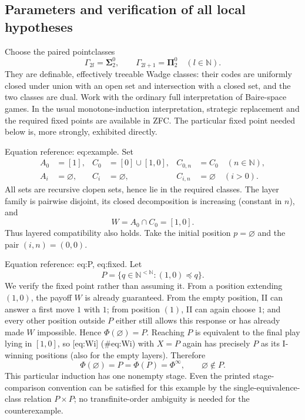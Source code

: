 \documentclass[10pt]{article}
\begin{document}
\subsection*{Parameters and verification of all local hypotheses}
Choose the paired pointclasses \[\Gamma_{2l}=\boldsymbol{\Sigma}^0_2,\qquad \Gamma_{2l+1}=\boldsymbol{\Pi}^0_2
 \quad(l\in\mathbb N).\] They are definable, effectively treeable Wadge classes: their codes are uniformly closed under union with an open set and intersection with a closed set, and the two classes are dual. Work with the ordinary full interpretation of Baire-space games. In the usual monotone-induction interpretation, strategic replacement and the required fixed points are available in ZFC. The particular fixed point needed below is, more strongly, exhibited directly.\par
Equation reference: eq:example. Set \[
\begin{aligned}
 A_0&=[1],& C_0&=[0]\cup[1,0],& C_{0,n}&=C_0\quad(n\in\mathbb N),\\
 A_i&=\varnothing,&C_i&=\varnothing,&C_{i,n}&=\varnothing\quad(i>0).
\end{aligned}\] All sets are recursive clopen sets, hence lie in the required classes. The layer family is pairwise disjoint, its closed decomposition is increasing (constant in \(n\)), and \[W=A_0\cap C_0=[1,0].\] Thus layered compatibility also holds. Take the initial position \(p=\varnothing\) and the pair \((i,n)=(0,0)\).\par
Equation reference: eq:P, eq:fixed. Let \[
 P=\{q\in\mathbb N^{<\mathbb N}:(1,0)\preccurlyeq q\}.\] We verify the fixed point rather than assuming it. From a position extending \((1,0)\), the payoff \(W\) is already guaranteed. From the empty position, II can answer a first move \(1\) with \(1\); from position \((1)\), II can again choose \(1\); and every other position outside \(P\) either still allows this response or has already made \(W\) impossible. Hence \(\Phi(\varnothing)=P\). Reaching \(P\) is equivalent to the final play lying in \([1,0]\), so [eq:Wi] (\#eq:Wi) with \(X=P\) again has precisely \(P\) as its I-winning positions (also for the empty layers). Therefore \[
 \Phi(\varnothing)=P=\Phi(P)=\Phi^\infty,\qquad
 \varnothing\notin P.\] This particular induction has one nonempty stage. Even the printed stage-comparison convention can be satisfied for this example by the single-equivalence-class relation \(P\times P\); no transfinite-order ambiguity is needed for the counterexample.\par
\end{document}
